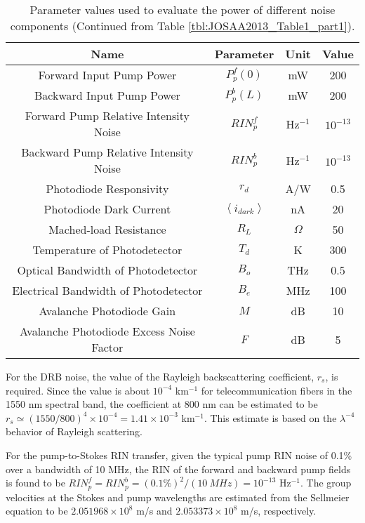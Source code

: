 \begin{table}[t]
\begin{centering}
\begin{tabular}{|c|c|c|c|} \hline
Name & Parameter & Unit & Value\\ \hline\hline
Forward Input Pump Power & $P_p^f(0)$ & mW & 200 \\ \hline
Backward Input Pump Power & $P_p^b(L)$ & mW & 200 \\ \hline
Forward Pump Relative Intensity Noise & $RIN_p^f$ & Hz$^{-1}$ & $10^{-13}$ \\ \hline
Backward Pump Relative Intensity Noise & $RIN_p^b$ & Hz$^{-1}$ & $10^{-13}$ \\ \hline
Photodiode Responsivity & $r_d$ & A/W & 0.5 \\ \hline
Photodiode Dark Current & $\left\langle i_{dark}\right\rangle$ & nA & 20 \\ \hline
Mached-load Resistance & $R_L$ & $\Omega$ & 50\\ \hline
Temperature of Photodetector & $T_d$ & K & 300 \\ \hline
Optical Bandwidth of Photodetector & $B_o$ & THz & 0.5 \\ \hline
Electrical Bandwidth of Photodetector & $B_e$ & MHz & 100 \\ \hline
Avalanche Photodiode Gain & $M$ & dB & 10 \\ \hline
Avalanche Photodiode Excess Noise Factor & $F$ & dB & 5 \\ \hline
\end{tabular}
\caption{Parameter values used to evaluate the power of different noise components (Continued from Table \ref{tbl:JOSAA2013_Table1_part1}).}
\label{tbl:JOSAA2013_Table1_part2}
\end{centering}
\end{table}

For the DRB noise, the value of the Rayleigh backscattering coefficient, $r_s$, is required. Since the value is about $10^{-4}$ km$^{-1}$ for telecommunication fibers in the 1550 nm spectral band, the coefficient at 800 nm can be estimated to be  $r_s \simeq (1550/800)^4 \times 10^{-4} = 1.41 \times 10^{-3}$ km$^{-1}$. This estimate is based on the $\lambda^{-4}$ behavior of Rayleigh scattering.

For the pump-to-Stokes RIN transfer, given the typical pump RIN noise of 0.1\% over a bandwidth of 10 MHz, the RIN of the forward and backward pump fields is found to be $RIN_p^f = RIN_p^b = (0.1\%)^2/(\SI{10}{MHz}) = 10^{-13}$ Hz$^{-1}$. The group velocities at the Stokes and pump wavelengths are estimated from the Sellmeier equation to be $2.051968 \times 10^8$ m/s and $2.053373 \times 10^8$ m/s, respectively.

